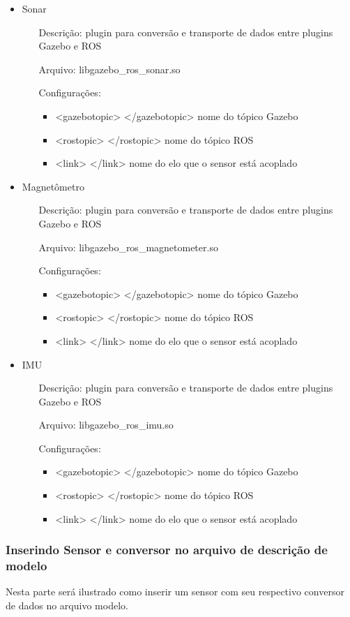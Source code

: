 \begin{itemize}
\item Sonar
\begin{itemize}
\item[Descrição:] plugin para conversão e transporte de dados entre plugins Gazebo e ROS
\item[Arquivo:] libgazebo\_ros\_sonar.so
\item[Configurações:]
\begin{itemize}
\item <gazebotopic> </gazebotopic> nome do tópico Gazebo
\item <rostopic> </rostopic> nome do tópico ROS
\item <link> </link> nome do elo que o sensor está acoplado
\end{itemize}
\end{itemize}
\end{itemize}

\begin{itemize}
\item Magnetômetro
\begin{itemize}
\item[Descrição:] plugin para conversão e transporte de dados entre plugins Gazebo e ROS
\item[Arquivo:] libgazebo\_ros\_magnetometer.so
\item[Configurações:]
\begin{itemize}
\item <gazebotopic> </gazebotopic> nome do tópico Gazebo
\item <rostopic> </rostopic> nome do tópico ROS
\item <link> </link> nome do elo que o sensor está acoplado
\end{itemize}
\end{itemize}
\end{itemize}

\begin{itemize}
\item IMU
\begin{itemize}
\item[Descrição:] plugin para conversão e transporte de dados entre plugins Gazebo e ROS
\item[Arquivo:] libgazebo\_ros\_imu.so
\item[Configurações:]
\begin{itemize}
\item <gazebotopic> </gazebotopic> nome do tópico Gazebo
\item <rostopic> </rostopic> nome do tópico ROS
\item <link> </link> nome do elo que o sensor está acoplado
\end{itemize}
\end{itemize}
\end{itemize}

\subsubsection{Inserindo Sensor e conversor no arquivo de descrição de modelo}

Nesta parte será ilustrado como inserir um sensor com seu respectivo conversor de dados no arquivo modelo.




